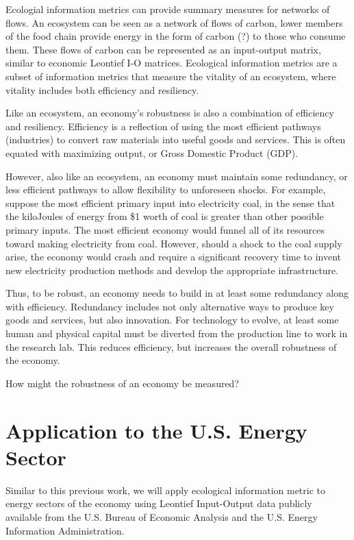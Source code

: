 \documentclass{article}
\begin{document}
Ecologial information metrics can provide summary measures for networks 
of flows. An ecosystem can be seen as a network of flows of 
carbon, lower members of the food chain provide energy in 
the form of carbon (?)
to those who consume them. These flows of carbon can be
represented as an input-output matrix, similar to economic
Leontief I-O matrices. Ecological information metrics are 
a subset of information metrics that measure the vitality
of an ecosystem, where vitality includes both efficiency and
resiliency. 

Like an ecosystem, an economy's robustness is also a combination
of efficiency and resiliency. Efficiency is a reflection of
using the most efficient pathways (industries) to convert
raw materials into useful goods and services. This is 
often equated with maximizing output, or Gross Domestic Product (GDP).

However, also like an ecosystem, an economy must maintain
some redundancy, or less efficient pathways to allow
flexibility to unforeseen shocks. For example, suppose the most
efficient primary input into electricity coal, in the sense that the 
kiloJoules of energy from \$1 worth of coal is greater than other
possible primary inputs. The most efficient economy would
funnel all of its resources toward making electricity from coal.
However, should a shock to the coal supply arise, the economy
would crash and require a significant recovery time to 
invent new electricity production methods and develop
the appropriate infrastructure.

Thus, to be robust, an economy needs to build in
at least some redundancy along with efficiency. Redundancy
includes not only alternative ways to produce key goods and
services, but also innovation. For technology to evolve,
at least some human and physical capital must be diverted from
the production line to work in the research lab. This reduces
efficiency, but increases the overall robustness of the economy.

How might the robustness of an economy be measured? 


\section{Application to the U.S. Energy Sector}
Similar to this previous work, we will apply ecological
information metric to energy sectors of the economy using
Leontief Input-Output data publicly available from the U.S.
Bureau of Economic Analysis and the U.S. Energy
Information Administration.
\end{document}
